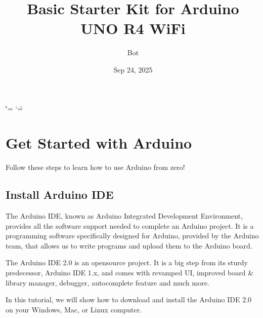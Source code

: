 \documentclass[a4paper,11pt,english]{sphinxmanual}
\title{Basic Starter Kit for Arduino UNO R4 WiFi}
\date{Sep 24, 2025}
\author{Bot}
\begin{document}
\ifdefined\shorthandoff
  \ifnum\catcode`\=\string=\active\shorthandoff{=}\fi
  \ifnum\catcode`\"=\active{}\fi
\fi

\pagestyle{empty}

        \maketitle
        \tableofcontents
    
\pagestyle{plain}
\sphinxtableofcontents
\pagestyle{normal}
\label{\detokenize{index::doc}}


\sphinxstepscope


\chapter{Get Started with Arduino}
\label{\detokenize{Get_Started_with_Arduino/Get_Started_with_Arduino:get-started-with-arduino}}\label{\detokenize{Get_Started_with_Arduino/Get_Started_with_Arduino::doc}}
\sphinxAtStartPar
Follow these steps to learn how to use Arduino from zero!

\sphinxstepscope


\section{Install Arduino IDE}
\label{\detokenize{Get_Started_with_Arduino/Install_Arduino_IDE:install-arduino-ide}}\label{\detokenize{Get_Started_with_Arduino/Install_Arduino_IDE:install-arduino}}\label{\detokenize{Get_Started_with_Arduino/Install_Arduino_IDE::doc}}
\sphinxAtStartPar
The Arduino IDE, known as Arduino Integrated Development Environment, provides all the software support needed to complete an Arduino project. It is a programming software specifically designed for Arduino, provided by the Arduino team, that allows us to write programs and upload them to the Arduino board.

\sphinxAtStartPar
The Arduino IDE 2.0 is an open\sphinxhyphen{}source project. It is a big step from its sturdy predecessor, Arduino IDE 1.x, and comes with revamped UI, improved board \& library manager, debugger, autocomplete feature and much more.

\sphinxAtStartPar
In this tutorial, we will show how to download and install the Arduino IDE 2.0 on your Windows, Mac, or Linux computer.
\end{document}
